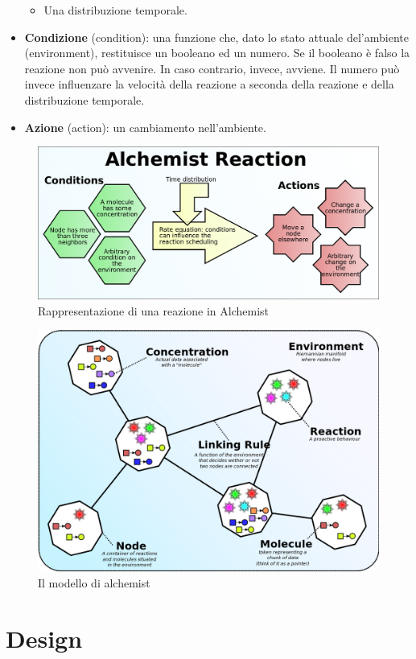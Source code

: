 \documentclass[12pt,a4paper,openright,twoside]{book}
\begin{document}
\begin{itemize}
\begin{itemize}
        \item Una distribuzione temporale.
    \end{itemize}
    \item \textbf{Condizione} (condition): una funzione che, dato lo stato attuale del’ambiente (environment), restituisce un booleano ed un numero. Se il booleano è falso la reazione non può avvenire. In caso contrario, invece, avviene. Il numero può invece influenzare la velocità della reazione a seconda della reazione e della distribuzione temporale.
    \item \textbf{Azione} (action): un cambiamento nell’ambiente.
\end{itemize}

\begin{figure}[h]
    \centering
    \includegraphics[width=.8\linewidth]{figures/alchemistReaction.png}
    \caption{Rappresentazione di una reazione in Alchemist}
    \label{fig:reactionAlchemist}
\end{figure}
\begin{figure}
    \centering
    \includegraphics[width=.8\linewidth]{figures/alchemistModel.png}
    \caption{Il modello di alchemist}
    \label{fig:rmodelAlchemist}
\end{figure}

\chapter{Design}
\end{document}
